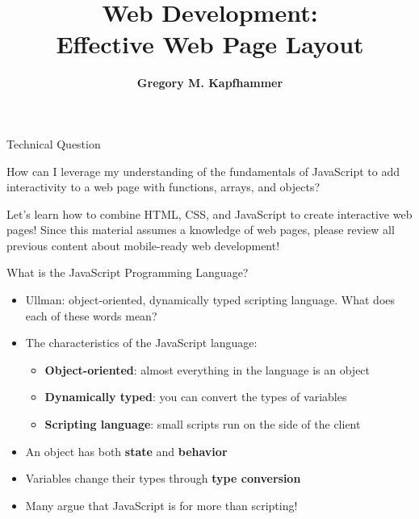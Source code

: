 \documentclass[14pt,aspectratio=169]{beamer}
\title{Web Development: \\ Effective Web Page Layout}
\author{{\bf Gregory M. Kapfhammer}}
\institute[shortinst]{{\bf Department of Computer Science, Allegheny College}}
\begin{document}
{
  \begin{frame}
    \titlepage
  \end{frame}
}

%
\begin{frame}{Technical Question}
  \hspace*{.25in}
  \vspace*{.2in}
  \begin{minipage}{4.5in}
    \begin{center}
      {\large How can I leverage my understanding of the fundamentals of
      JavaScript to add interactivity to a web page with functions, arrays, and
      objects?}
    \end{center}
  \end{minipage}
  \vspace{2ex}
  \begin{center}
    \small Let's learn how to combine HTML, CSS, and JavaScript to create
    interactive web pages! Since this material assumes a knowledge of web pages,
    please review all previous content about mobile-ready web development! \\
  \end{center}
\end{frame}

%
\begin{frame}{What is the JavaScript Programming Language?}
  \begin{itemize}
    \item Ullman: object-oriented, dynamically typed scripting language. What
      does each of these words mean?
      \vspace*{-.15in}
    \item The characteristics of the JavaScript language:
      \begin{itemize}
        \item {\bf Object-oriented}: almost everything in the language is an
          object
        \item {\bf Dynamically typed}: you can convert the types of variables
        \item {\bf Scripting language}: small scripts run on the side of the client
      \end{itemize}
      \vspace*{-.2in}
    \item An object has both {\bf state} and {\bf behavior}
      \vspace*{-.2in}
    \item Variables change their types through {\bf type conversion}
      \vspace*{-.2in}
    \item Many argue that JavaScript is for more than scripting!
  \end{itemize}
\end{frame}
\end{document}
